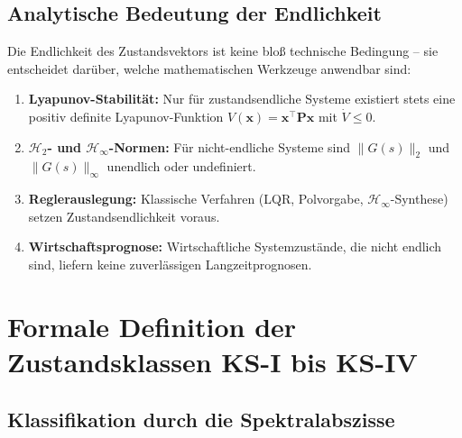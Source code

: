 \documentclass[a4paper, 12pt, twoside, openright]{report}
\theoremstyle{definition}
\theoremstyle{definition}
\newcommand{\vx}{\bm{x}}
\newcommand{\vP}{\bm{P}}
\newcommand{\T}{\top}
\begin{document}
\subsection{Analytische Bedeutung der Endlichkeit}

Die Endlichkeit des Zustandsvektors ist keine bloß technische Bedingung -- sie
entscheidet darüber, welche mathematischen Werkzeuge anwendbar sind:

\begin{enumerate}[label=(\arabic*)]
  \item \textbf{Lyapunov-Stabilität:} Nur für zustandsendliche Systeme existiert stets
    eine positiv definite Lyapunov-Funktion $V(\vx) = \vx^\T\vP\vx$ mit
    $\dot{V} \leq 0$.
  \item \textbf{$\mathcal{H}_2$- und $\mathcal{H}_\infty$-Normen:} Für
    nicht-endliche Systeme sind $\|G(s)\|_2$ und $\|G(s)\|_\infty$ unendlich oder
    undefiniert.
  \item \textbf{Reglerauslegung:} Klassische Verfahren (LQR, Polvorgabe, $\mathcal{H}_\infty$-Synthese)
    setzen Zustandsendlichkeit voraus.
  \item \textbf{Wirtschaftsprognose:} Wirtschaftliche Systemzustände, die nicht endlich
    sind, liefern keine zuverlässigen Langzeitprognosen.
\end{enumerate}

\section{Formale Definition der Zustandsklassen KS-I bis KS-IV}
\label{sec:klassen}

\subsection{Klassifikation durch die Spektralabszisse}
\end{document}
